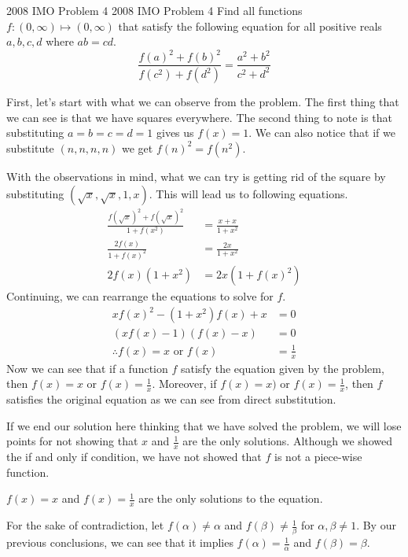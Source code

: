 \documentclass[../../../main.tex]{subfiles}
\begin{document}
\begin{problem}{2008 IMO Problem 4 \hard}{2008 IMO Problem 4}
Find all functions $f: (0, \infty) \mapsto (0, \infty)$ that satisfy
the following equation for all positive reals $a, b, c, d$ where
$ab = cd$.
\[
\frac{ f(a)^2 + f(b)^2 }{f(c^2) + f(d^2)}
= \frac{a^2 + b^2}{c^2 + d^2}
\]
\end{problem}
\begin{solution}
First, let's start with what we can observe from the problem.
The first thing that we can see is that we have squares everywhere.
The second thing to note is that substituting $a = b = c = d = 1$
gives us $f(x) = 1$. We can also notice that if we substitute
$(n, n, n, n)$ we get $f(n)^2 = f(n^2)$.

With the observations in mind, what we can try is getting rid of
the square by substituting $(\sqrt{x}, \sqrt{x}, 1, x)$. This
will lead us to following equations.
\begin{align*}
    \frac{ f(\sqrt{x})^2 + f(\sqrt{x})^2 }{ 1 + f(x^2) }
    &= \frac{x + x}{1 + x^2} \\
    \frac{ 2f(x) }{ 1 + f(x)^2 }
    &= \frac{2x}{1 + x^2} \\
    2f(x) (1 + x^2)
    &= 2x(1 + f(x)^2)
\end{align*}
Continuing, we can rearrange the equations to solve for $f$.
\begin{align*}
    xf(x)^2 - (1 + x^2)f(x) + x &= 0 \\
    (xf(x) - 1) (f(x) - x) &= 0 \\
    \therefore
    f(x) = x \text{ or } f(x) &= \frac{1}{x}
\end{align*}
Now we can see that if a function $f$ satisfy the equation given
by the problem, then $f(x) = x$ or $f(x) = \frac{1}{x}$. Moreover,
if $f(x) = x)$ or $f(x) = \frac{1}{x}$, then $f$ satisfies the
original equation as we can see from direct substitution.

If we end our solution here thinking that we have solved the problem,
we will lose points for not showing that $x$ and $\frac{1}{x}$
are the only solutions. Although we showed the if and only if
condition, we have not showed that $f$ is not a piece-wise function.

\begin{lemma*}
$f(x) = x$ and $f(x) = \frac{1}{x}$ are the only solutions to the
equation.
\end{lemma*}
\begin{proofInBox}
For the sake of contradiction, let $f(\alpha) \neq \alpha$ and
$f(\beta) \neq \frac{1}{\beta}$ for $\alpha, \beta \neq 1$.
By our previous conclusions, we can see that it implies
$f(\alpha) = \frac{1}{\alpha}$ and $f(\beta) = \beta$.


\end{proofInBox}
\end{solution}
\end{document}
